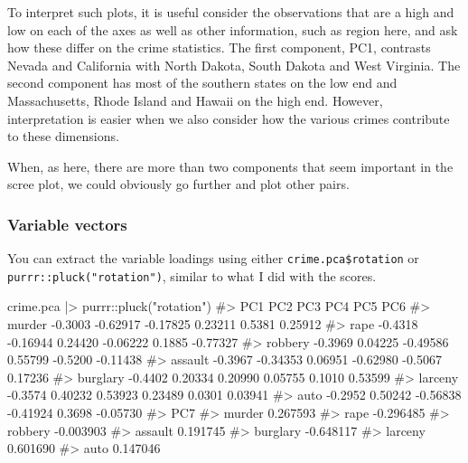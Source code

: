 \documentclass[
  letterpaper,
  10pt,
  krantz2]{krantz}
\makeatletter
\newenvironment{Shaded}{\begin{snugshade}}{\end{snugshade}}
\newcommand{\CommentTok}[1]{\textcolor[rgb]{0.37,0.37,0.37}{#1}}
\newcommand{\FunctionTok}[1]{\textcolor[rgb]{0.28,0.35,0.67}{#1}}
\newcommand{\NormalTok}[1]{\textcolor[rgb]{0.00,0.23,0.31}{#1}}
\newcommand{\SpecialCharTok}[1]{\textcolor[rgb]{0.37,0.37,0.37}{#1}}
\newcommand{\StringTok}[1]{\textcolor[rgb]{0.13,0.47,0.30}{#1}}
\newenvironment{kframe}{%
  \medskip{}
  \setlength{\fboxsep}{.8em}
  \def\at@end@of@kframe{}%
  \ifinner\ifhmode%
  \def\at@end@of@kframe{\end{minipage}}%
  \begin{minipage}{\columnwidth}%
  \fi\fi%
  \def\FrameCommand##1{\hskip\@totalleftmargin \hskip-\fboxsep
  \colorbox{shadecolor}{##1}\hskip-\fboxsep
      \hskip-\linewidth \hskip-\@totalleftmargin \hskip\columnwidth}%
  \MakeFramed {\advance\hsize-\width
    \@totalleftmargin\z@ \linewidth\hsize
    \@setminipage}}%
{\par\unskip\endMakeFramed%
  \at@end@of@kframe}
\renewenvironment{Shaded}{\begin{kframe}}{\end{kframe}}
\makeatother
\begin{document}
To interpret such plots, it is useful consider the observations that are
a high and low on each of the axes as well as other information, such as
region here, and ask how these differ on the crime statistics. The first
component, PC1, contrasts Nevada and California with North Dakota, South
Dakota and West Virginia. The second component has most of the southern
states on the low end and Massachusetts, Rhode Island and Hawaii on the
high end. However, interpretation is easier when we also consider how
the various crimes contribute to these dimensions.

When, as here, there are more than two components that seem important in
the scree plot, we could obviously go further and plot other pairs.

\subsubsection*{Variable vectors}\label{variable-vectors}

You can extract the variable loadings using either
\texttt{crime.pca\$rotation} or \texttt{purrr::pluck("rotation")},
similar to what I did with the scores.

\begin{Shaded}
\begin{Highlighting}[]
\NormalTok{crime.pca }\SpecialCharTok{|\textgreater{}}\NormalTok{ purrr}\SpecialCharTok{::}\FunctionTok{pluck}\NormalTok{(}\StringTok{"rotation"}\NormalTok{)}
\CommentTok{\#\textgreater{}              PC1      PC2      PC3      PC4     PC5      PC6}
\CommentTok{\#\textgreater{} murder   {-}0.3003 {-}0.62917 {-}0.17825  0.23211  0.5381  0.25912}
\CommentTok{\#\textgreater{} rape     {-}0.4318 {-}0.16944  0.24420 {-}0.06222  0.1885 {-}0.77327}
\CommentTok{\#\textgreater{} robbery  {-}0.3969  0.04225 {-}0.49586  0.55799 {-}0.5200 {-}0.11438}
\CommentTok{\#\textgreater{} assault  {-}0.3967 {-}0.34353  0.06951 {-}0.62980 {-}0.5067  0.17236}
\CommentTok{\#\textgreater{} burglary {-}0.4402  0.20334  0.20990  0.05755  0.1010  0.53599}
\CommentTok{\#\textgreater{} larceny  {-}0.3574  0.40232  0.53923  0.23489  0.0301  0.03941}
\CommentTok{\#\textgreater{} auto     {-}0.2952  0.50242 {-}0.56838 {-}0.41924  0.3698 {-}0.05730}
\CommentTok{\#\textgreater{}                PC7}
\CommentTok{\#\textgreater{} murder    0.267593}
\CommentTok{\#\textgreater{} rape     {-}0.296485}
\CommentTok{\#\textgreater{} robbery  {-}0.003903}
\CommentTok{\#\textgreater{} assault   0.191745}
\CommentTok{\#\textgreater{} burglary {-}0.648117}
\CommentTok{\#\textgreater{} larceny   0.601690}
\CommentTok{\#\textgreater{} auto      0.147046}
\end{Highlighting}
\end{Shaded}
\end{document}
